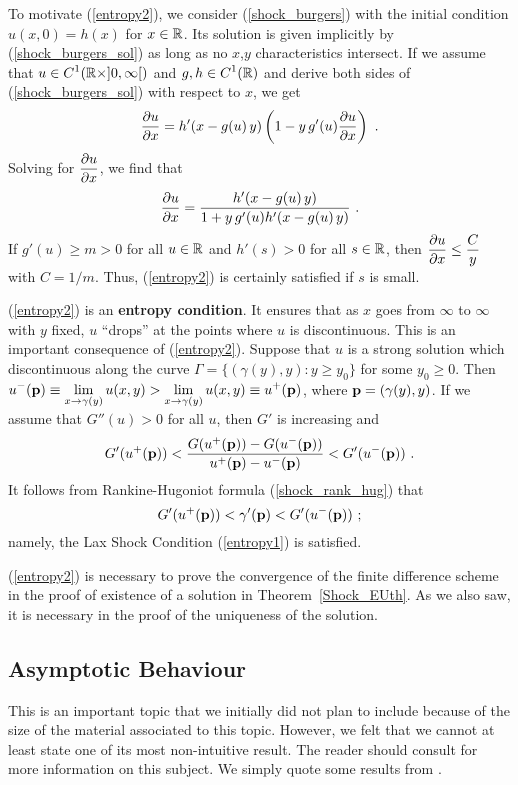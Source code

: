 To motivate (\ref{entropy2}), we consider (\ref{shock_burgers}) with the
initial condition $u(x,0) = h(x)$ for $x \in \mathbb{R}$.  Its solution is
given implicitly by (\ref{shock_burgers_sol}) as long as no $x$,$y$
characteristics intersect.  If we assume that
$\displaystyle u \in C^1(\mathbb{R}\times]0,\infty[)$ and
$\displaystyle g,h \in C^1(\mathbb{R})$ and derive both sides of
(\ref{shock_burgers_sol}) with respect to $x$, we get
\[
\frac{\partial{u}}{\partial x} = h'(x-g(u)\,y) \left( 1 - y\,g'(u) \frac{\partial{u}}{\partial x}\right) \ .
\]
Solving for $\displaystyle \frac{\partial{u}}{\partial x}$, we find that
\[
\frac{\partial{u}}{\partial x} = \frac{h'(x-g(u)\,y)}{1 +y\, g'(u) h'(x-g(u)\,y)} \ .
\]
If $g'(u) \geq m > 0$ for all $u\in \mathbb{R}$ and $h'(s) > 0$ for all $s
\in \mathbb{R}$, then $\displaystyle \frac{\partial{u}}{\partial x} \leq \frac{C}{y}$
with $C = 1/m$.   Thus, (\ref{entropy2}) is certainly satisfied if $s$
is small.

(\ref{entropy2}) is an
{\bfseries entropy condition}.
It ensures that as $x$ goes from $\infty$ to $\infty$ with $y$ fixed, $u$
``drops'' at the points where $u$ is discontinuous.
This is an important consequence of (\ref{entropy2}).  Suppose that
$u$ is a strong solution which discontinuous along the curve
$\Gamma = \{ (\gamma(y),y) : y \geq y_0 \}$ for some $y_0\geq 0$.
Then
$\displaystyle u^-(\mathbf{p}) \equiv \lim_{x\to \gamma(y)} u(x,y) >
\lim_{x\to \gamma(y)} u(x,y) \equiv u^+(\mathbf{p})$, where
$\mathbf{p} = (\gamma(y),y)$.  If we assume that $G''(u) > 0$
for all $u$, then $G'$ is increasing and
\[
G'(u^+(\mathbf{p})) <
\frac{G(u^+(\mathbf{p})) - G(u^-(\mathbf{p}))}{u^+(\mathbf{p}) - u^-(\mathbf{p})}
< G'(u^-(\mathbf{p})) \ .
\]
It follows from Rankine-Hugoniot formula (\ref{shock_rank_hug}) that
\[
G'(u^+(\mathbf{p})) < \gamma'(\mathbf{p}) < G'(u^-(\mathbf{p})) \ ;
\]
namely, the Lax Shock Condition (\ref{entropy1}) is satisfied.

(\ref{entropy2}) is necessary to prove the convergence of the finite
difference scheme in the proof of existence of a solution in
Theorem~\ref{Shock_EUth}.  As we also saw, it is necessary in the
proof of the uniqueness of the solution.

\subsection{Asymptotic Behaviour}

This is an important topic that we initially did not plan to include
because of the size of the material associated to this topic.
However, we felt that we cannot at least state one of its most
non-intuitive result.  The reader should consult \cite{Lax2,Smo} for
more information on this subject.  We simply quote some results from
\cite{Lax2}.

